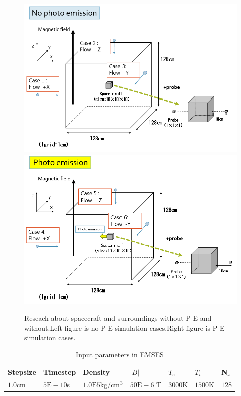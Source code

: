 \begin{figure}
        \includegraphics[width = 0.5 \textwidth]{images/picture_simulation1.png}
        \includegraphics[width = 0.5 \textwidth]{images/picture_simulation2-2.png}
        \caption{Reseach about spacecraft and surroundings without P-E and without.Left figure is no P-E simulation cases.Right figure is P-E simulation cases.}
    \end{figure}

	\begin{table}
		\centering
	    \begin{tabular}{ | l | l | l| l| l | l | l |}
	    \hline
		Stepsize & Timestep & Density &\(|B|\) & \(T_e\) & \(T_i\) & N\(_x\)\\
		\hline
		\(1.0\)cm & \(5\text{E}-10\)s & \(1.0\text{E}5\)kg/cm\(^3\) &  \(50\text{E}-6\) T & \(3000\)K & \(1500\)K  & \(128\)\\
	    \hline
	    \end{tabular}
		\caption{Input parameters in EMSES}
	\end{table}
